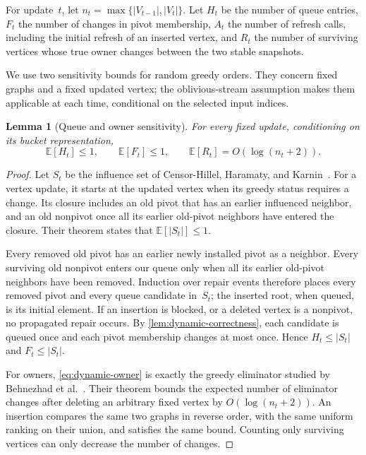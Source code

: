 \documentclass[11pt,letterpaper]{article}
\newtheorem{lemma}[theorem]{Lemma}
\theoremstyle{definition}
\theoremstyle{remark}
\newcommand{\E}{\mathbb{E}}
\newcommand{\1}{\mathbf{1}}
\begin{document}
For update~$t$, let $n_t=\max\{|V_{t-1}|,|V_t|\}$.  Let $H_t$ be the number of queue entries, $F_t$ the number of changes in pivot membership, $A_t$ the number of refresh calls, including the initial refresh of an inserted vertex, and $R_t$ the number of surviving vertices whose true owner changes between the two stable snapshots.

We use two sensitivity bounds for random greedy orders.  They concern fixed graphs and a fixed updated vertex; the oblivious-stream assumption makes them applicable at each time, conditional on the selected input indices.

\begin{lemma}[Queue and owner sensitivity]\label{lem:dynamic-sensitivity}
For every fixed update, conditioning on its bucket representation,
\[
 \E[H_t]\le1,
 \qquad
 \E[F_t]\le1,
 \qquad
 \E[R_t]=O(\log(n_t+2)).
\]
\end{lemma}

\begin{proof}
Let $S_t$ be the influence set of Censor-Hillel, Haramaty, and Karnin~\cite[Theorem~1]{censor-hillel-2016}.  For a vertex update, it starts at the updated vertex when its greedy status requires a change.  Its closure includes an old pivot that has an earlier influenced neighbor, and an old nonpivot once all its earlier old-pivot neighbors have entered the closure.  Their theorem states that $\E[|S_t|]\le1$.

Every removed old pivot has an earlier newly installed pivot as a neighbor.  Every surviving old nonpivot enters our queue only when all its earlier old-pivot neighbors have been removed.  Induction over repair events therefore places every removed pivot and every queue candidate in~$S_t$; the inserted root, when queued, is its initial element.  If an insertion is blocked, or a deleted vertex is a nonpivot, no propagated repair occurs.  By \cref{lem:dynamic-correctness}, each candidate is queued once and each pivot membership changes at most once.  Hence $H_t\le|S_t|$ and $F_t\le|S_t|$.

For owners, \cref{eq:dynamic-owner} is exactly the greedy eliminator studied by Behnezhad et al.~\cite[Theorem~3]{behnezhad-2019}.  Their theorem bounds the expected number of eliminator changes after deleting an arbitrary fixed vertex by $O(\log(n_t+2))$.  An insertion compares the same two graphs in reverse order, with the same uniform ranking on their union, and satisfies the same bound.  Counting only surviving vertices can only decrease the number of changes.
\end{proof}
\end{document}
